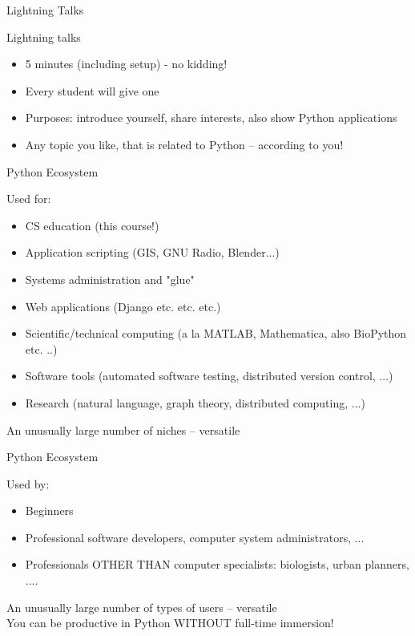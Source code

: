 \documentclass{beamer}
\begin{document}
\begin{frame}{Lightning Talks}

{\Large Lightning talks}
\begin{itemize}
   \item 5 minutes (including setup) - no kidding!
   \item Every student will give one
   \item Purposes: introduce yourself, share interests, also show Python applications
   \item Any topic you like, that is related to Python -- according to you!
\end{itemize}
\end{frame}


\begin{frame}{Python Ecosystem}

{\Large Used for:} 
\begin{itemize}
  \item CS education (this course!)  
  \item Application scripting (GIS, GNU Radio, Blender...)
  \item Systems administration and "glue"
  \item Web applications (Django etc. etc. etc.)
  \item Scientific/technical computing (a la MATLAB, Mathematica, also BioPython etc. ..)
  \item Software tools (automated software testing, distributed version control, ...)
  \item Research (natural language, graph theory, distributed computing, ...)
\end{itemize}

 An unusually large number of niches -- versatile
\end{frame}

\begin{frame}{Python Ecosystem}

{\Large Used by:} 
\begin{itemize}
  \item Beginners
  \item Professional software developers, computer system administrators, ...  
  \item Professionals OTHER THAN computer specialists: biologists, urban planners, ....
\end{itemize}
\vspace{0.25in}
 An unusually large number of types of users -- versatile\\[0.25in]
 You can be productive in Python WITHOUT full-time immersion!
\end{frame}
\end{document}
